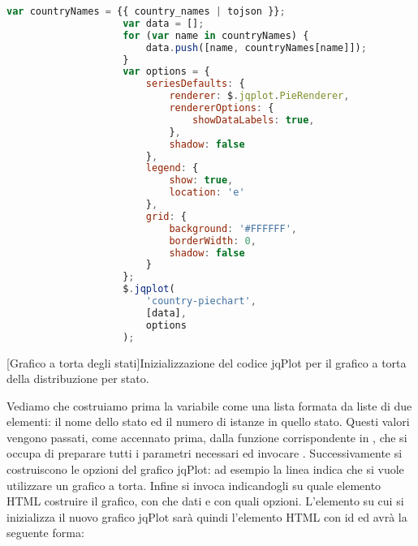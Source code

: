             \begin{center}
                \begin{lstlisting}[language=javascript, gobble=18]
                    var countryNames = {{ country_names | tojson }};
                    var data = [];
                    for (var name in countryNames) {
                        data.push([name, countryNames[name]]);
                    }
                    var options = { 
                        seriesDefaults: {
                            renderer: $.jqplot.PieRenderer,
                            rendererOptions: {
                                showDataLabels: true,
                            },
                            shadow: false
                        },
                        legend: {
                            show: true,
                            location: 'e'
                        },
                        grid: {
                            background: '#FFFFFF',
                            borderWidth: 0,
                            shadow: false
                        }
                    };
                    $.jqplot(
                        'country-piechart',
                        [data],
                        options
                    );
                \end{lstlisting}
                \captionsetup{textformat=empty,labelformat=empty} \vspace{-2em}
                [Grafico a torta degli stati]{Inizializzazione del codice jqPlot per il grafico a torta della distribuzione per stato.}
            \end{center}
            
            Vediamo che costruiamo prima la variabile  come una lista formata da liste di due elementi: il nome dello stato ed il numero di istanze in quello stato. Questi valori vengono passati, come accennato prima, dalla funzione corrispondente in , che si occupa di preparare tutti i parametri necessari ed invocare . Successivamente si costruiscono le opzioni del grafico jqPlot: ad esempio la linea  indica che si vuole utilizzare un grafico a torta. Infine si invoca  indicandogli su quale elemento \ac{HTML} costruire il grafico, con che dati e con quali opzioni. L'elemento su cui si inizializza il nuovo grafico jqPlot sarà quindi l'elemento \ac{HTML} con id  ed avrà la seguente forma:
            
